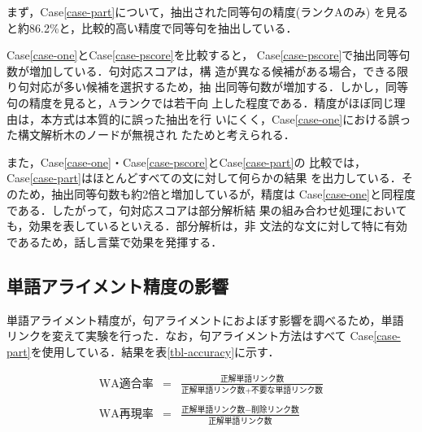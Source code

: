 まず，Case\ref{case-part}について，抽出された同等句の精度(ランクAのみ)
を見ると約86.2\%と，比較的高い精度で同等句を抽出している．

Case\ref{case-one}とCase\ref{case-pscore}を比較すると，
Case\ref{case-pscore}で抽出同等句数が増加している．句対応スコアは，構
造が異なる候補がある場合，できる限り句対応が多い候補を選択するため，抽
出同等句数が増加する．しかし，同等句の精度を見ると，Aランクでは若干向
上した程度である．精度がほぼ同じ理由は，本方式は本質的に誤った抽出を行
いにくく，Case\ref{case-one}における誤った構文解析木のノードが無視され
たためと考えられる．

また，Case\ref{case-one}・Case\ref{case-pscore}とCase\ref{case-part}の
比較では，Case\ref{case-part}はほとんどすべての文に対して何らかの結果
を出力している．そのため，抽出同等句数も約2倍と増加しているが，精度は
Case\ref{case-one}と同程度である．したがって，句対応スコアは部分解析結
果の組み合わせ処理においても，効果を表しているといえる．部分解析は，非
文法的な文に対して特に有効であるため，話し言葉で効果を発揮する．

\subsection{単語アライメント精度の影響}

単語アライメント精度が，句アライメントにおよぼす影響を調べるため，単語
リンクを変えて実験を行った．なお，句アライメント方法はすべて
Case\ref{case-part}を使用している．結果を表\ref{tbl-accuracy}に示す．

\label{case-content}

\label{case-func-precision}

\vspace*{-10pt}
\begin{eqnarray*}
\mbox{WA適合率} & =  &
 \frac{\mbox{正解単語リンク数}}
      {\mbox{正解単語リンク数} + \mbox{不要な単語リンク数}} \\ \\
\mbox{WA再現率} & = &
 \frac{\mbox{正解単語リンク数} - \mbox{削除リンク数}}
      {\mbox{正解単語リンク数}}
\end{eqnarray*}
\vspace*{3pt}

